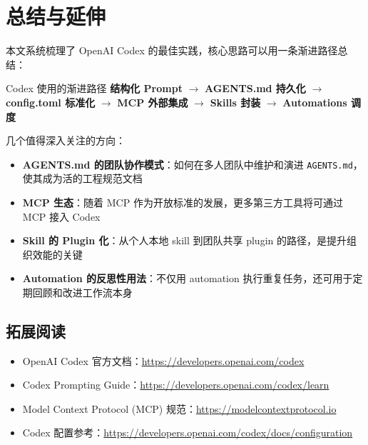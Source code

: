 \section{总结与延伸}

本文系统梳理了 OpenAI Codex 的最佳实践，核心思路可以用一条渐进路径总结：

\begin{importantbox}{Codex 使用的渐进路径}
\textbf{结构化 Prompt} $\rightarrow$ \textbf{AGENTS.md 持久化} $\rightarrow$ \textbf{config.toml 标准化} $\rightarrow$ \textbf{MCP 外部集成} $\rightarrow$ \textbf{Skills 封装} $\rightarrow$ \textbf{Automations 调度}
\end{importantbox}

几个值得深入关注的方向：

\begin{itemize}
    \item \textbf{AGENTS.md 的团队协作模式}：如何在多人团队中维护和演进 \texttt{AGENTS.md}，使其成为活的工程规范文档
    \item \textbf{MCP 生态}：随着 MCP 作为开放标准的发展，更多第三方工具将可通过 MCP 接入 Codex
    \item \textbf{Skill 的 Plugin 化}：从个人本地 skill 到团队共享 plugin 的路径，是提升组织效能的关键
    \item \textbf{Automation 的反思性用法}：不仅用 automation 执行重复任务，还可用于定期回顾和改进工作流本身
\end{itemize}

\subsection{拓展阅读}

\begin{itemize}
    \item OpenAI Codex 官方文档：\url{https://developers.openai.com/codex}
    \item Codex Prompting Guide：\url{https://developers.openai.com/codex/learn}
    \item Model Context Protocol (MCP) 规范：\url{https://modelcontextprotocol.io}
    \item Codex 配置参考：\url{https://developers.openai.com/codex/docs/configuration}
\end{itemize}



